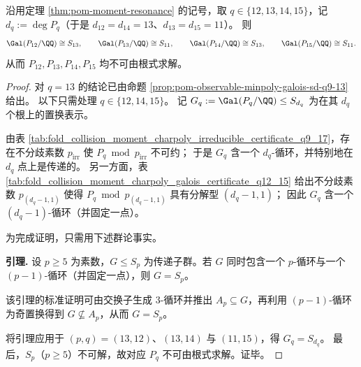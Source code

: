 \begin{theorem}[共振窗特征多项式在 \texorpdfstring{$q=12,13,14,15$}{q=12,13,14,15} 的满对称伽罗瓦性]\label{thm:pom-resonance-minpoly-galois-sd-q12-15}
沿用定理 \ref{thm:pom-moment-resonance} 的记号，取 \(q\in\{12,13,14,15\}\)，记 \(d_q:=\deg P_q\)（于是 \(d_{12}=d_{14}=13\)、\(d_{13}=d_{15}=11\)）。
则
\[
\Gal(P_{12}/\QQ)\cong S_{13},\qquad
\Gal(P_{13}/\QQ)\cong S_{11},\qquad
\Gal(P_{14}/\QQ)\cong S_{13},\qquad
\Gal(P_{15}/\QQ)\cong S_{11}.
\]
从而 \(P_{12},P_{13},P_{14},P_{15}\) 均不可由根式求解。
\end{theorem}
\begin{proof}
对 \(q=13\) 的结论已由命题 \ref{prop:pom-observable-minpoly-galois-sd-q9-13} 给出。
以下只需处理 \(q\in\{12,14,15\}\)。
记 \(G_q:=\Gal(P_q/\QQ)\le S_{d_q}\) 为在其 \(d_q\) 个根上的置换表示。

由表 \ref{tab:fold_collision_moment_charpoly_irreducible_certificate_q9_17}，存在不分歧素数 \(p_{\mathrm{irr}}\) 使 \(P_q\bmod p_{\mathrm{irr}}\) 不可约；
于是 \(G_q\) 含一个 \(d_q\)-循环，并特别地在 \(d_q\) 点上是传递的。
另一方面，表 \ref{tab:fold_collision_moment_charpoly_galois_certificate_q12_15} 给出不分歧素数 \(p_{(d_q-1,1)}\) 使得
\(
P_q\bmod p_{(d_q-1,1)}
 \)
具有分解型 \((d_q-1,1)\)；
因此 \(G_q\) 含一个 \((d_q-1)\)-循环（并固定一点）。

为完成证明，只需用下述群论事实。
\par
\noindent\textbf{引理.}
设 \(p\ge 5\) 为素数，\(G\le S_p\) 为传递子群。若 \(G\) 同时包含一个 \(p\)-循环与一个 \((p-1)\)-循环（并固定一点），则 \(G=S_p\)。
\par
\noindent
该引理的标准证明可由交换子生成 \(3\)-循环并推出 \(A_p\subseteq G\)，再利用 \((p-1)\)-循环为奇置换得到 \(G\not\subseteq A_p\)，从而 \(G=S_p\)。

将引理应用于 \((p,q)=(13,12)\)、\((13,14)\) 与 \((11,15)\)，得 \(G_q=S_{d_q}\)。
最后，\(S_p\)（\(p\ge 5\)）不可解，故对应 \(P_q\) 不可由根式求解。证毕。
\end{proof}


